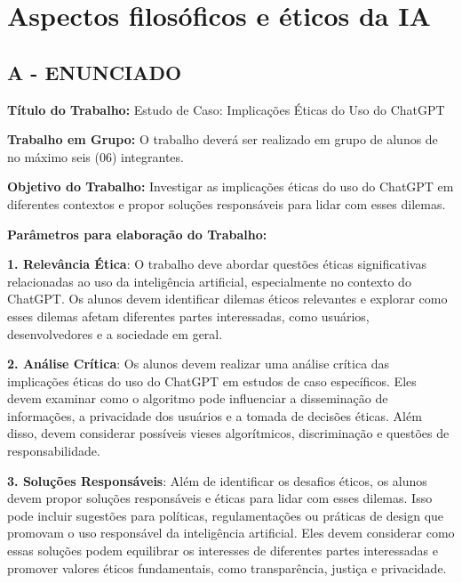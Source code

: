\label{ap:ap07}
\chapter{Aspectos filosóficos e éticos da IA}
\section*{\textbf{A - ENUNCIADO}}

\textbf{Título do Trabalho:} {\textquotedbl}Estudo de Caso: Implicações Éticas do Uso do ChatGPT{\textquotedbl}



\textbf{Trabalho em Grupo:} O trabalho deverá ser realizado em grupo de alunos de no máximo seis (06) integrantes.



\textbf{Objetivo do Trabalho:} Investigar as implicações éticas do uso do ChatGPT em diferentes contextos e propor soluções
responsáveis para lidar com esses dilemas.

\textbf{Parâmetros para elaboração do Trabalho:}



\textbf{1. Relevância Ética}: O trabalho deve abordar questões éticas significativas relacionadas ao uso da inteligência
artificial, especialmente no contexto do ChatGPT. Os alunos devem identificar dilemas éticos relevantes e explorar como
esses dilemas afetam diferentes partes interessadas, como usuários, desenvolvedores e a sociedade em geral.

\textbf{2. Análise Crítica}: Os alunos devem realizar uma análise crítica das implicações éticas do uso do ChatGPT em
estudos de caso específicos. Eles devem examinar como o algoritmo pode influenciar a disseminação de informações, a
privacidade dos usuários e a tomada de decisões éticas. Além disso, devem considerar possíveis vieses algorítmicos,
discriminação e questões de responsabilidade.

\textbf{3. Soluções Responsáveis}: Além de identificar os desafios éticos, os alunos devem propor soluções responsáveis
e éticas para lidar com esses dilemas. Isso pode incluir sugestões para políticas, regulamentações ou práticas de
design que promovam o uso responsável da inteligência artificial. Eles devem considerar como essas soluções podem
equilibrar os interesses de diferentes partes interessadas e promover valores éticos fundamentais, como transparência,
justiça e privacidade.

